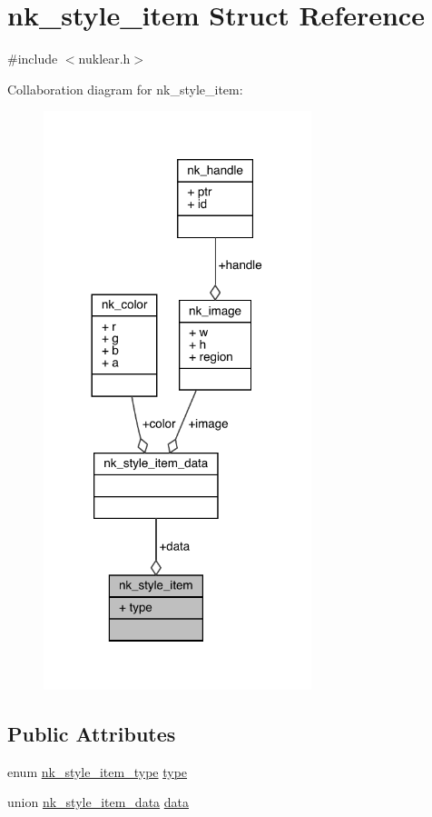 \hypertarget{structnk__style__item}{}\section{nk\+\_\+style\+\_\+item Struct Reference}
\label{structnk__style__item}


{\ttfamily \#include $<$nuklear.\+h$>$}



Collaboration diagram for nk\+\_\+style\+\_\+item\+:
\nopagebreak
\begin{figure}[H]
\begin{center}
\leavevmode
\includegraphics[width=221pt]{structnk__style__item__coll__graph}
\end{center}
\end{figure}
\subsection*{Public Attributes}
\begin{DoxyCompactItemize}
\item 
enum \mbox{\hyperlink{nuklear_8h_a3674d18d76a677a8315f60351fad473c}{nk\+\_\+style\+\_\+item\+\_\+type}} \mbox{\hyperlink{structnk__style__item_a743eeb49a50622632466d9300faaf448}{type}}
\item 
union \mbox{\hyperlink{unionnk__style__item__data}{nk\+\_\+style\+\_\+item\+\_\+data}} \mbox{\hyperlink{structnk__style__item_ad96b1cf96a4ec74e9229e8986a03cc4f}{data}}
\end{DoxyCompactItemize}


